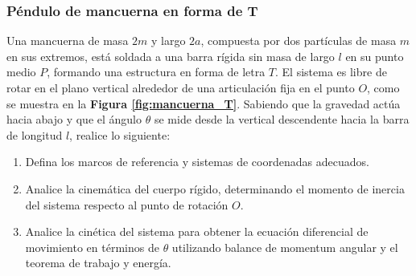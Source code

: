 \subsubsection{Péndulo de mancuerna en forma de T}

Una mancuerna de masa $2m$ y largo $2a$, compuesta por dos partículas de masa $m$ en sus extremos, está soldada a una barra rígida sin masa de largo $l$ en su punto medio $P$, formando una estructura en forma de letra $T$. El sistema es libre de rotar en el plano vertical alrededor de una articulación fija en el punto $O$, como se muestra en la \textbf{Figura \ref{fig:mancuerna_T}}. Sabiendo que la gravedad actúa hacia abajo y que el ángulo $\theta$ se mide desde la vertical descendente hacia la barra de longitud $l$, realice lo siguiente:

\begin{enumerate}
    \item Defina los marcos de referencia y sistemas de coordenadas adecuados.
    \item Analice la cinemática del cuerpo rígido, determinando el momento de inercia del sistema respecto al punto de rotación $O$.
    \item Analice la cinética del sistema para obtener la ecuación diferencial de movimiento en términos de $\theta$ utilizando balance de momentum angular y el teorema de trabajo y energía.
\end{enumerate}

